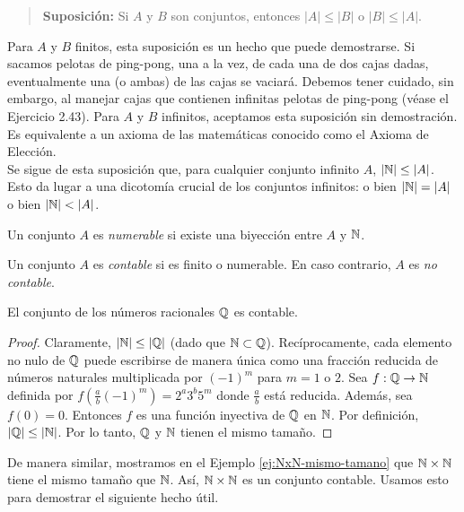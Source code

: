 \documentclass[12pt,a4paper]{book}
\begin{document}
    \begin{quote}
        \textbf{Suposición:} Si $A$ y $B$ son conjuntos, entonces $|A|\leq|B|$ o $|B|\leq|A|$.
    \end{quote}

    Para $A$ y $B$ finitos, esta suposición es un hecho que puede demostrarse. Si sacamos pelotas de ping-pong, una a la
    vez, de cada una de dos cajas dadas, eventualmente una (o ambas) de las cajas se vaciará. Debemos tener cuidado, sin
    embargo, al manejar cajas que contienen infinitas pelotas de ping-pong (véase el Ejercicio 2.43). Para $A$ y $B$
    infinitos, aceptamos esta suposición sin demostración. Es equivalente a un axioma de las matemáticas conocido como el
    Axioma de Elección.\\
    Se sigue de esta suposición que, para cualquier conjunto infinito $A$, $|\mathbb{N}|\leq|A|$. Esto da lugar a una dicotomía
    crucial de los conjuntos infinitos: o bien $|\mathbb{N}|=|A|$ o bien $|\N|<|A|$.

    \begin{definicion}\label{def:numerable}
        Un conjunto $A$ es \textit{numerable} si existe una biyección entre $A$ y $\mathbb{N}$.
    \end{definicion}

    \begin{definicion}\label{def:contable}
        Un conjunto $A$ es \textit{contable} si es finito o numerable. En caso contrario, $A$ es \textit{no contable}.
    \end{definicion}

    \begin{proposicion}\label{prop:Q-contable}
        El conjunto de los números racionales $\mathbb{Q}$ es contable.
    \end{proposicion}
    \begin{proof}
        Claramente, $|\mathbb{N}|\leq|\mathbb{Q}|$ (dado que $\mathbb{N}\subset\mathbb{Q}$). Recíprocamente, cada elemento no nulo de $\mathbb{Q}$ puede escribirse
        de manera única como una fracción reducida de números naturales multiplicada por $(-1)^{m}$ para $m=1$ o $2$. Sea
        $f:\mathbb{Q}\rightarrow\mathbb{N}$ definida por $f\left(\frac{a}{b}(-1)^{m}\right)=2^{a}3^{b}5^{m}$ donde $\frac{a}{b}$ está
        reducida. Además, sea $f(0)=0$. Entonces $f$ es una función inyectiva de $\mathbb{Q}$ en $\mathbb{N}$. Por definición,
        $|\mathbb{Q}|\leq|\mathbb{N}|$. Por lo tanto, $\mathbb{Q}$ y $\mathbb{N}$ tienen el mismo tamaño.
    \end{proof}

    De manera similar, mostramos en el Ejemplo \ref{ej:NxN-mismo-tamano} que $\mathbb{N}\times\mathbb{N}$ tiene el mismo tamaño que $\mathbb{N}$.
    Así, $\mathbb{N}\times\mathbb{N}$ es un conjunto contable. Usamos esto para demostrar el siguiente hecho útil.
\end{document}
